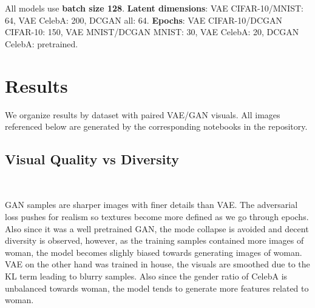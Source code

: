 \documentclass[twocolumn]{article}
\begin{document}
\begin{table}[h]
  \centering
  \large\bfseries
  \renewcommand{\arraystretch}{1.5}
  \normalfont
  \caption{Key hyperparameters and training settings for VAEs and DCGANs.}
  \label{tab:models}
\end{table}

All models use \textbf{batch size 128}. \textbf{Latent dimensions}: VAE CIFAR-10/MNIST: 64, VAE CelebA: 200, DCGAN all: 64. \textbf{Epochs}: VAE CIFAR-10/DCGAN CIFAR-10: 150, VAE MNIST/DCGAN MNIST: 30, VAE CelebA: 20, DCGAN CelebA: pretrained.


\section{Results}
We organize results by dataset with paired VAE/GAN visuals. All images referenced below are generated by the corresponding notebooks in the repository.

\subsection{Visual Quality vs Diversity} \

GAN samples are sharper images with finer details than VAE. The adversarial loss pushes for realism so textures become more defined as we go through
epochs. Also since it was a well pretrained GAN, the mode collapse is avoided and decent diversity is observed, however, as the training samples contained more images of woman, the model becomes slighly biased towards generating images of woman.
VAE on the other hand was trained in house, the visuals are smoothed due to the KL term leading to blurry samples.
Also since the gender ratio of CelebA is unbalanced towards woman, the model tends to generate more features related to woman. 
\end{document}
